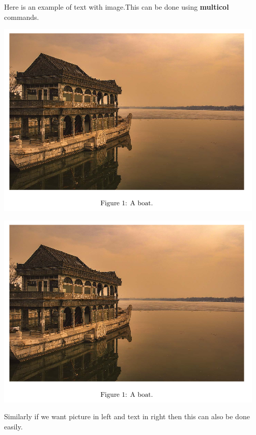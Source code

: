 \documentclass{article}
\begin{document}
\begin{center}
\begin{multicols}{2}
Here is an example of text with image.This can be done using \textbf{multicol} commands.

\columnbreak

\includegraphics[width=\linewidth]{boat.png}
  
\end{multicols}
\end{center}

\begin{center}
\begin{multicols}{2}
\includegraphics[width=\linewidth]{boat.png}

\columnbreak

Similarly if we want picture in left and text in right then this can also be done easily.
  
\end{multicols}
\end{center}
\end{document}
